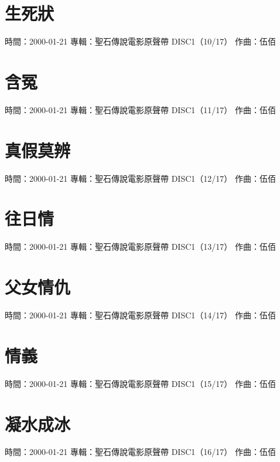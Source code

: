 \documentclass[UTF8,a4paper,oneside,twocolumn,12pt]{ctexbook}
\newcommand{\infopair}[2]{\textbullet #1：#2}
\newcommand{\zq}[1][伍佰]{\infopair{作曲}{#1}}
\newcommand{\zj}[1]{\infopair{專輯}{#1}}
\newcommand{\sj}[1]{\infopair{時間}{#1}}
\newenvironment{info}{\begin{flushleft}\kaishu
	}
	{\end{flushleft}\normalsize\yahei\par}
\begin{document}
\section{生死狀}
\begin{info}
	\sj{2000-01-21}
	\zj{聖石傳說電影原聲帶 DISC1（10/17）}
	\zq
\end{info}

\section{含冤}
\begin{info}
	\sj{2000-01-21}
	\zj{聖石傳說電影原聲帶 DISC1（11/17）}
	\zq
\end{info}

\section{真假莫辨}
\begin{info}
	\sj{2000-01-21}
	\zj{聖石傳說電影原聲帶 DISC1（12/17）}
	\zq
\end{info}

\section{往日情}
\begin{info}
	\sj{2000-01-21}
	\zj{聖石傳說電影原聲帶 DISC1（13/17）}
	\zq
\end{info}

\section{父女情仇}
\begin{info}
	\sj{2000-01-21}
	\zj{聖石傳說電影原聲帶 DISC1（14/17）}
	\zq
\end{info}

\section{情義}
\begin{info}
	\sj{2000-01-21}
	\zj{聖石傳說電影原聲帶 DISC1（15/17）}
	\zq
\end{info}

\section{凝水成冰}
\begin{info}
	\sj{2000-01-21}
	\zj{聖石傳說電影原聲帶 DISC1（16/17）}
	\zq
\end{info}
\end{document}
